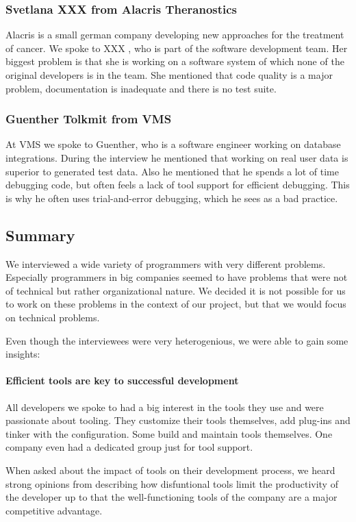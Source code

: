 \subsubsection{Svetlana XXX from Alacris Theranostics}  Alacris is a small german company developing new approaches for the treatment of cancer. We spoke to XXX , who is part of the software development team. Her biggest problem is that she is working on a software system of which none of the original developers is in the team. She mentioned that code quality is a major problem, documentation is inadequate and there is no test suite.

\subsubsection{Guenther Tolkmit from VMS} At VMS we spoke to Guenther, who is a software engineer working on database integrations. During the interview he mentioned that working on real user data is superior to generated test data. Also he mentioned that he spends a lot of time debugging code, but often feels a lack of tool support for efficient debugging. This is why he often uses trial-and-error debugging, which he sees as a bad practice.

\subsection{Summary} We interviewed a wide variety of programmers with very different problems. Especially programmers in big companies seemed to have problems that were not of technical but rather organizational nature. We decided it is not possible for us to work on these problems in the context of our project, but that we would focus on technical problems.

Even though the interviewees were very heterogenious, we were able to gain some insights:

\paragraph{Efficient tools are key to successful development} All developers we spoke to had a big interest in the tools they use and were passionate about tooling. They customize their tools themselves, add plug-ins and tinker with the configuration. Some build and maintain tools themselves. One company even had a dedicated group just for tool support.

When asked about the impact of tools on their development process, we heard strong opinions from describing how disfuntional tools limit the productivity of the developer up to that the well-functioning tools of the company are a major competitive advantage.

